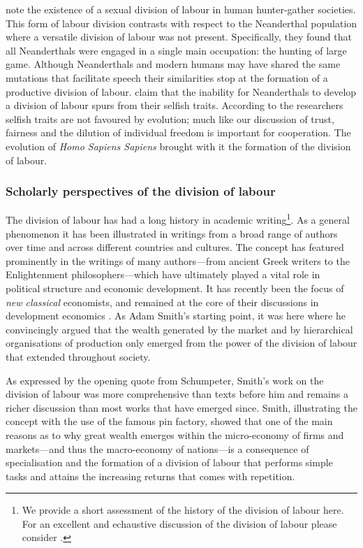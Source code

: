 \citet{KuhnSteiner2006} note the existence of a sexual division of labour in human hunter-gather societies. This form of labour division contrasts with respect to the Neanderthal population where a versatile division of labour was not present. Specifically, they found that all Neanderthals were engaged in a single main occupation: the hunting of large game. Although Neanderthals and modern humans may have shared the same mutations that facilitate speech their similarities stop at the formation of a productive division of labour. \citet{AdamiHintze2013} claim that the inability for Neanderthals to develop a division of labour spurs from their selfish traits. According to the researchers selfish traits are not favoured by evolution; much like our discussion of trust, fairness and the dilution of individual freedom is important for cooperation. The evolution of \emph{Homo Sapiens Sapiens} brought with it the formation of the division of labour.

\subsubsection{Scholarly perspectives of the division of labour}

The division of labour has had a long history in academic writing\footnote{We provide a short assessment of the history of the division of labour here. For an excellent and echaustive discussion of the division of labour please consider \citet{Sun2012}.}. As a general phenomenon it has been illustrated in writings from a broad range of authors over time and across different countries and cultures. The concept has featured prominently in the writings of many authors---from ancient Greek writers to the Enlightenment philosophers---which have ultimately played a vital role in political structure and economic development. It has recently been the focus of \emph{new classical} economists, and remained at the core of their discussions in development economics \citep{Yang2003}. As Adam Smith's starting point, it was here where he convincingly argued that the wealth generated by the market and by hierarchical organisations of production only emerged from the power of the division of labour that extended throughout society.

As expressed by the opening quote from Schumpeter, Smith's work on the division of labour was more comprehensive than texts before him and remains a richer discussion than most works that have emerged since. Smith, illustrating the concept with the use of the famous pin factory, showed that one of the main reasons as to why great wealth emerges within the micro-economy of firms and markets---and thus the macro-economy of nations---is a consequence of specialisation and the formation of a division of labour that performs simple tasks and attains the increasing returns that comes with repetition.

